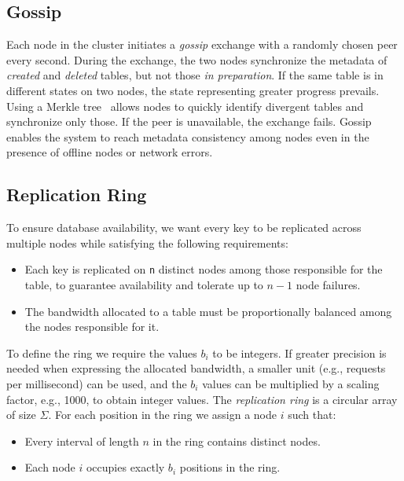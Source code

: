 \subsection{Gossip}
\label{subsec:gossip}

Each node in the cluster initiates a \emph{gossip} exchange with a randomly chosen peer every second.
During the exchange, the two nodes synchronize the metadata of \emph{created} and \emph{deleted} tables, but not those \emph{in preparation}.
If the same table is in different states on two nodes, the state representing greater progress prevails.
Using a Merkle tree~\cite{MerkleTree} allows nodes to quickly identify divergent tables and synchronize only those.
If the peer is unavailable, the exchange fails.
Gossip enables the system to reach metadata consistency among nodes even in the presence of offline nodes or network errors.

\subsection{Replication Ring}
\label{subsec:replication-ring}

To ensure database availability, we want every key to be replicated across multiple nodes while satisfying the following requirements:

\begin{itemize}
    \item Each key is replicated on \texttt{n} distinct nodes among those responsible for the table, to guarantee availability and tolerate up to $n-1$ node failures.
    \item The bandwidth allocated to a table must be proportionally balanced among the nodes responsible for it.
\end{itemize}

To define the ring we require the values $b_i$ to be integers.
If greater precision is needed when expressing the allocated bandwidth, a smaller unit (e.g., requests per millisecond) can be used, and the $b_i$ values can be multiplied by a scaling factor, e.g., 1000, to obtain integer values.
The \emph{replication ring} is a circular array of size $\Sigma$.
For each position in the ring we assign a node $i$ such that:

\begin{itemize}
    \item Every interval of length $n$ in the ring contains distinct nodes.
    \item Each node $i$ occupies exactly $b_i$ positions in the ring.
\end{itemize}

